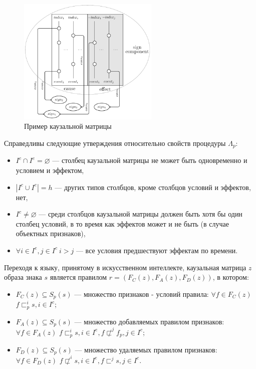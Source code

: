 \documentclass[12pt]{scrartcl}
\begin{document}
	\begin{figure}[H]
		\centering
		\includegraphics[width=0.6\textwidth]{causnet/caus_matr}
		\caption{Пример каузальной матрицы}	
		\label{fig:caus_matr}	
	\end{figure}
	
	Справедливы следующие утверждения относительно свойств процедуры $\Lambda_p$:
	\begin{itemize}
		\item $I^c\cap I^e=\varnothing$ --- столбец каузальной матрицы не может быть одновременно и условием и эффектом,
		\item $|I^c\cup I^e|=h$ --- других типов столбцов, кроме столбцов условий и эффектов, нет,
		\item $I^c\not = \varnothing$ --- среди столбцов каузальной матрицы должен быть хотя бы один столбец условий, в то время как эффектов может и не быть (в случае объектных признаков),
		\item $\forall i\in I^e, j\in I^c\ i>j$ --- все условия предшествуют эффектам по времени.
	\end{itemize}
	
	Переходя к языку, принятому в искусственном интеллекте, каузальная матрица $z$ образа знака $s$ является правилом $r=(F_C(z),F_A(z),F_D(z))$, в котором:
	\begin{itemize}
		\item $F_C (z)\subseteq S_p(s)$ --- множество признаков - условий правила: $\forall f\in F_C(z)$ $f\sqsubset_p^i s, i\in I^c$;
		
		\item $F_A(z)\subseteq S_p(s)$ --- множество добавляемых правилом признаков: $\forall f\in F_A(z)$ $f\sqsubset_p^i s,i\in I^e, f\not\sqsubset^j f_p, j\in I^c$;
		
		\item $F_D(z)\subseteq S_p(s)$ --- множество удаляемых правилом признаков: $\forall f\in F_D(z)$ $f\not\sqsubset^i s, i\in I^e,f\sqsubset^j s, j\in I^c$.
	\end{itemize}
\end{document}
